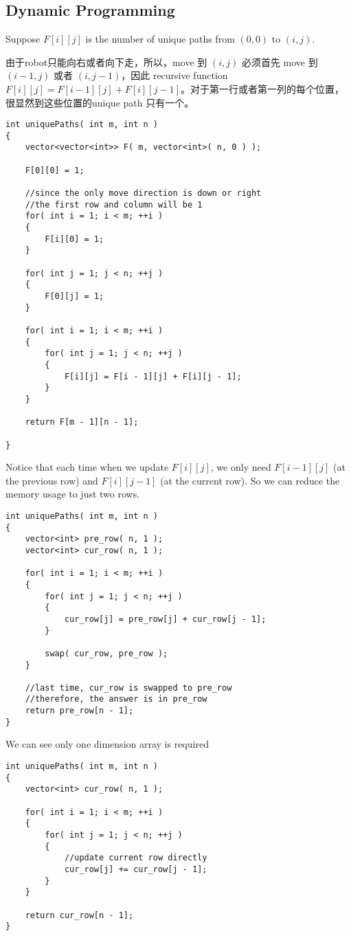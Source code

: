 \subsection{Dynamic Programming}
Suppose $F[i][j]$ is the number of unique paths from $(0,0)$ to $(i,j)$. 

由于robot只能向右或者向下走，所以，move 到 $(i,j)$ 必须首先 move 到 $(i-1, j)$ 或者 $(i, j-1)$，因此 recursive function $F[i][j] = F[i-1][j] + F[i][j-1]$。对于第一行或者第一列的每个位置，很显然到这些位置的unique path 只有一个。

\setcounter{lstlisting}{0}
\begin{lstlisting}[style=customc, caption={Two Dimensional DP}]
int uniquePaths( int m, int n )
{
    vector<vector<int>> F( m, vector<int>( n, 0 ) );

    F[0][0] = 1;

    //since the only move direction is down or right
    //the first row and column will be 1
    for( int i = 1; i < m; ++i )
    {
        F[i][0] = 1;
    }

    for( int j = 1; j < n; ++j )
    {
        F[0][j] = 1;
    }

    for( int i = 1; i < m; ++i )
    {
        for( int j = 1; j < n; ++j )
        {
            F[i][j] = F[i - 1][j] + F[i][j - 1];
        }
    }

    return F[m - 1][n - 1];

}
\end{lstlisting}

Notice that each time when we update $F[i][j]$, we only need $F[i - 1][j]$ (at the previous row) and $F[i][j - 1]$ (at the current row). So we can reduce the memory usage to just two rows.

\begin{lstlisting}[style=customc, caption={Two One Dimension DP Array}]
int uniquePaths( int m, int n )
{
    vector<int> pre_row( n, 1 );
    vector<int> cur_row( n, 1 );

    for( int i = 1; i < m; ++i )
    {
        for( int j = 1; j < n; ++j )
        {
            cur_row[j] = pre_row[j] + cur_row[j - 1];
        }

        swap( cur_row, pre_row );
    }

    //last time, cur_row is swapped to pre_row
    //therefore, the answer is in pre_row
    return pre_row[n - 1];
}
\end{lstlisting}

We can see only one dimension array is required 

\begin{lstlisting}[style=customc, caption={One Dimension DP Array}]
int uniquePaths( int m, int n )
{
    vector<int> cur_row( n, 1 );

    for( int i = 1; i < m; ++i )
    {
        for( int j = 1; j < n; ++j )
        {
            //update current row directly
            cur_row[j] += cur_row[j - 1];
        }
    }

    return cur_row[n - 1];
}
\end{lstlisting}